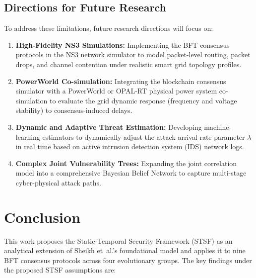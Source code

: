 \documentclass[10pt,twocolumn,letterpaper]{article}
\begin{document}
\begin{enumerate}[leftmargin=*]
\subsection{Directions for Future Research}
To address these limitations, future research directions will focus on:
\begin{enumerate}[leftmargin=*]
    \item \textbf{High-Fidelity NS3 Simulations:} Implementing the BFT consensus protocols in the NS3 network simulator to model packet-level routing, packet drops, and channel contention under realistic smart grid topology profiles.
    \item \textbf{PowerWorld Co-simulation:} Integrating the blockchain consensus simulator with a PowerWorld or OPAL-RT physical power system co-simulation to evaluate the grid dynamic response (frequency and voltage stability) to consensus-induced delays.
    \item \textbf{Dynamic and Adaptive Threat Estimation:} Developing machine-learning estimators to dynamically adjust the attack arrival rate parameter $\lambda$ in real time based on active intrusion detection system (IDS) network logs.
    \item \textbf{Complex Joint Vulnerability Trees:} Expanding the joint correlation model into a comprehensive Bayesian Belief Network to capture multi-stage cyber-physical attack paths.
\end{enumerate}

\section{Conclusion}
\label{sec:conclusion}

This work proposes the Static-Temporal Security Framework (STSF) as an analytical extension of Sheikh et~al.'s foundational model and applies it to nine BFT consensus protocols across four evolutionary groups. The key findings under the proposed STSF assumptions are:


\end{enumerate}
\end{document}
